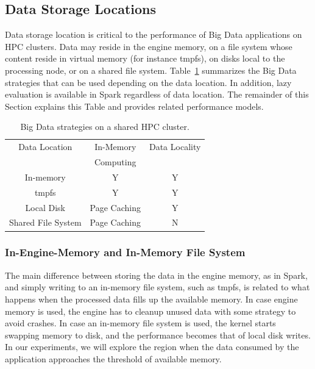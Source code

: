 \documentclass{IEEEtran}
\begin{document}

\subsection{Data Storage Locations}

Data storage location is critical to the performance of Big Data 
applications on HPC clusters.
Data may reside in the engine memory, on 
a file system whose content reside in virtual memory (for instance 
tmpfs), on disks local to the processing node, or on a shared 
file system. Table~\ref{table:features} summarizes the Big Data 
strategies that can be used depending on the data location. In 
addition, lazy evaluation is available in Spark regardless of data 
location. The remainder of this Section explains this Table and 
provides related performance models.
\begin{table}
\centering
\begin{tabular}{c|cc}
   \rowcolor{headcolor}
    Data Location                 & In-Memory     & Data Locality        \\
    \rowcolor{headcolor}
                                  & Computing     &                     \\
                                  \hline          
In-memory                         &   Y           & Y                       \\
tmpfs                             &   Y           & Y                   \\
Local Disk                        & Page Caching  & Y                   \\
Shared File System                & Page Caching  & N                
\end{tabular}
\caption{Big Data strategies on a shared HPC cluster.}
\label{table:features}
\end{table}

\subsubsection{In-Engine-Memory and In-Memory File System} 

 The main difference between storing the data in the engine memory, as in Spark, 
 and simply writing to an in-memory file system, such as tmpfs, is 
 related to what happens when the processed data fills up the available 
 memory. In case engine memory is used, the engine has to cleanup 
 unused data with some strategy to avoid crashes. In case an in-memory 
 file system is used, the kernel starts swapping memory to disk, and 
 the performance becomes that of local disk writes. In our experiments, 
 we will explore the region  when the data consumed by the 
 application approaches the threshold of available memory.
\end{document}
